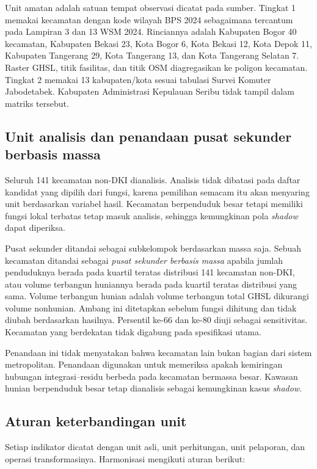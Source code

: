 \documentclass[12pt,a4paper,oneside,openany,indonesian]{report}
\begin{document}
Unit amatan adalah satuan tempat observasi dicatat pada sumber. Tingkat
1 memakai kecamatan dengan kode wilayah BPS 2024 sebagaimana tercantum
pada Lampiran 3 dan 13 WSM 2024. Rinciannya adalah Kabupaten Bogor 40
kecamatan, Kabupaten Bekasi 23, Kota Bogor 6, Kota Bekasi 12, Kota Depok
11, Kabupaten Tangerang 29, Kota Tangerang 13, dan Kota Tangerang Selatan
7. Raster GHSL, titik fasilitas, dan titik OSM diagregasikan ke poligon
kecamatan. Tingkat 2 memakai 13 kabupaten/kota sesuai tabulasi Survei
Komuter Jabodetabek. Kabupaten Administrasi Kepulauan Seribu tidak
tampil dalam matriks tersebut.

\subsection{Unit analisis dan penandaan pusat sekunder berbasis
massa}\label{unit-analisis-substantif}

Seluruh 141 kecamatan non-DKI dianalisis. Analisis tidak dibatasi pada
daftar kandidat yang dipilih dari fungsi, karena pemilihan semacam itu
akan menyaring unit berdasarkan variabel hasil. Kecamatan berpenduduk
besar tetapi memiliki fungsi lokal terbatas tetap masuk analisis,
sehingga kemungkinan pola \emph{shadow} dapat diperiksa.

Pusat sekunder ditandai sebagai subkelompok berdasarkan massa saja.
Sebuah kecamatan ditandai sebagai \emph{pusat sekunder berbasis massa}
apabila jumlah penduduknya berada pada kuartil teratas distribusi 141
kecamatan non-DKI, atau volume terbangun huniannya berada pada kuartil
teratas distribusi yang sama. Volume terbangun hunian adalah volume
terbangun total GHSL dikurangi volume nonhunian. Ambang ini ditetapkan
sebelum fungsi dihitung dan tidak diubah berdasarkan hasilnya.
Persentil ke-66 dan ke-80 diuji
sebagai sensitivitas. Kecamatan yang berdekatan tidak digabung pada
spesifikasi utama.

Penandaan ini tidak menyatakan bahwa kecamatan lain bukan bagian dari
sistem metropolitan. Penandaan digunakan untuk memeriksa apakah
kemiringan hubungan integrasi--residu berbeda pada kecamatan bermassa
besar. Kawasan hunian berpenduduk besar tetap dianalisis sebagai
kemungkinan kasus \emph{shadow}.

\subsection{Aturan keterbandingan
unit}\label{aturan-keterbandingan-unit}

Setiap indikator dicatat dengan unit asli, unit perhitungan, unit
pelaporan, dan operasi transformasinya. Harmonisasi mengikuti aturan
berikut:
\end{document}
